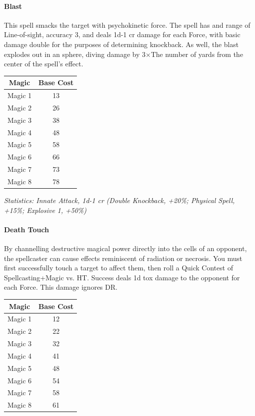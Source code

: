 \begin{multicols}{3}
	\paragraph{Blast}
	
	This spell smacks the target with psychokinetic force. The spell has and range of Line-of-sight, accuracy 3, and deals 1d-1 cr damage for each Force, with basic damage double for the purposes of determining knockback. As well, the blast explodes out in an sphere, diving damage by 3\(\times\)The number of yards from the center of the spell's effect. 
	
	\begin{center}
		\begin{tabular}{|c|c|}
			\hline
			Magic & Base Cost \\
			\hline
			\hline
			Magic 1 & 13 \\
			Magic 2 & 26 \\
			Magic 3 & 38 \\
			Magic 4 & 48 \\
			Magic 5 & 58 \\
			Magic 6 & 66 \\
			Magic 7 & 73 \\
			Magic 8 & 78 \\
			\hline
		\end{tabular}
	\end{center}
	
	\textcolor{OliveGreen}{\textit{Statistics: Innate Attack, 1d-1 cr (Double Knockback, +20\%; Physical Spell, +15\%; Explosive 1, +50\%)}}
	
	\paragraph{Death Touch}
	
	By channelling destructive magical power directly into the cells of an opponent, the spellcaster can cause effects reminiscent of radiation or necrosis. You must first successfully touch a target to affect them, then roll a Quick Contest of Spellcasting+Magic vs. HT. Success deals 1d tox damage to the opponent for each Force. This damage ignores DR.
	
	\begin{center}
		\begin{tabular}{|c|c|}
			\hline
			Magic & Base Cost \\
			\hline
			\hline
			Magic 1 & 12 \\
			Magic 2 & 22 \\
			Magic 3 & 32 \\
			Magic 4 & 41 \\
			Magic 5 & 48 \\
			Magic 6 & 54 \\
			Magic 7 & 58 \\
			Magic 8 & 61 \\
			\hline
		\end{tabular}
	\end{center}
	

\end{multicols}
